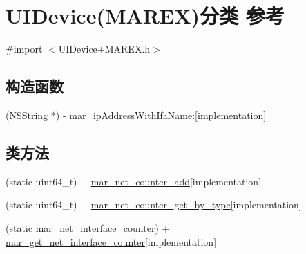 \hypertarget{category_u_i_device_07_m_a_r_e_x_08}{}\section{U\+I\+Device(M\+A\+R\+EX)分类 参考}
\label{category_u_i_device_07_m_a_r_e_x_08}


{\ttfamily \#import $<$U\+I\+Device+\+M\+A\+R\+E\+X.\+h$>$}

\subsection*{构造函数}
\begin{DoxyCompactItemize}
\item 
(N\+S\+String $\ast$) -\/ \hyperlink{category_u_i_device_07_m_a_r_e_x_08_a08b5414b423d4e3df4e4e89185f7d239}{mar\+\_\+ip\+Address\+With\+Ifa\+Name\+:}{\ttfamily  \mbox{[}implementation\mbox{]}}
\end{DoxyCompactItemize}
\subsection*{类方法}
\begin{DoxyCompactItemize}
\item 
(static uint64\+\_\+t) + \hyperlink{category_u_i_device_07_m_a_r_e_x_08_aea1f85cddfeb5c77009673b1da0c8d2b}{mar\+\_\+net\+\_\+counter\+\_\+add}{\ttfamily  \mbox{[}implementation\mbox{]}}
\item 
(static uint64\+\_\+t) + \hyperlink{category_u_i_device_07_m_a_r_e_x_08_a011e99d6f128d0d1322f1819125527ce}{mar\+\_\+net\+\_\+counter\+\_\+get\+\_\+by\+\_\+type}{\ttfamily  \mbox{[}implementation\mbox{]}}
\item 
(static \hyperlink{structmar__net__interface__counter}{mar\+\_\+net\+\_\+interface\+\_\+counter}) + \hyperlink{category_u_i_device_07_m_a_r_e_x_08_ad7e621ddd1e8b124330755447a7d442a}{mar\+\_\+get\+\_\+net\+\_\+interface\+\_\+counter}{\ttfamily  \mbox{[}implementation\mbox{]}}
\end{DoxyCompactItemize}
